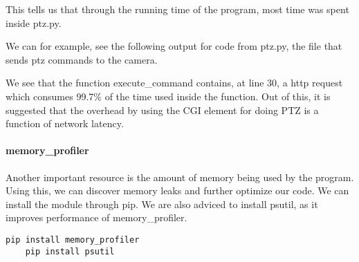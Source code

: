 This tells us that through the running time of the program, most time was spent inside ptz.py.

We can for example, see the following output for code from ptz.py, the file that sends ptz commands to the camera.

We see that the function execute\_command contains, at line 30, a http request which consumes 99.7\% of the time used inside the function. Out of this, it is suggested that the overhead by using the CGI element for doing PTZ is a function of network latency.

\paragraph{memory\_profiler}
Another important resource is the amount of memory being used by the program. Using this, we can discover memory leaks and further optimize our code. We can install the module through pip. We are also adviced to install psutil, as it improves performance of memory\_profiler.

\begin{lstlisting}[style=BashInputStyle]
    pip install memory_profiler
    pip install psutil
\end{lstlisting}
